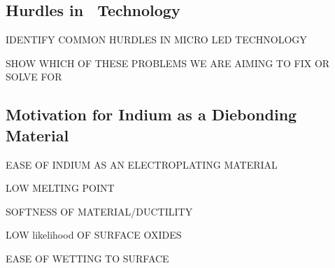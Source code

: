\subsection{Hurdles in \uled \ Technology}

IDENTIFY COMMON HURDLES IN MICRO LED TECHNOLOGY

SHOW WHICH OF THESE PROBLEMS WE ARE AIMING TO FIX OR SOLVE FOR


\subsection{Motivation for Indium as a Diebonding Material}

EASE OF INDIUM AS AN ELECTROPLATING MATERIAL

LOW MELTING POINT

SOFTNESS OF MATERIAL/DUCTILITY

LOW likelihood OF SURFACE OXIDES

EASE OF WETTING TO SURFACE
